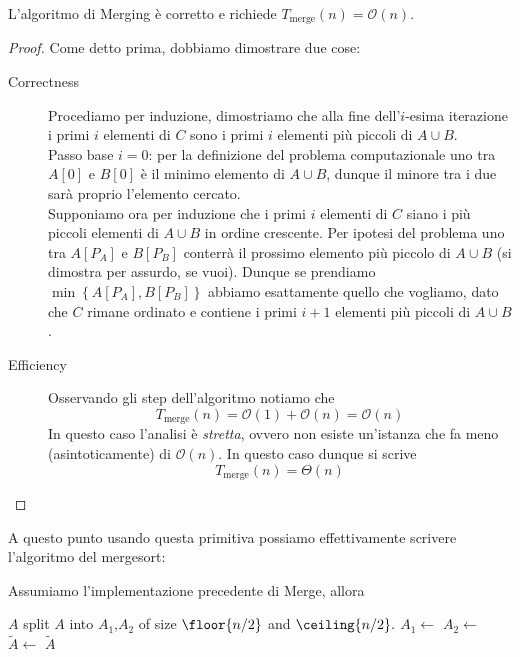 \documentclass[11pt]{scrartcl}
\newcommand{\bigo}{\mathcal{O}}
\begin{document}
	\begin{theorem}
		L'algoritmo di Merging è corretto e richiede $T_\text{merge}(n)=\bigo(n)$.
	\end{theorem}
	\begin{proof}
		Come detto prima, dobbiamo dimostrare due cose:
		\begin{description}
			\item[Correctness] Procediamo per induzione, dimostriamo che alla fine dell'$i$-esima iterazione i primi $i$ elementi di $C$ sono i primi $i$ elementi più piccoli di $A\cup B$. \\
			Passo base $i=0$: per la definizione del problema computazionale uno tra $A[0]$ e $B[0]$ è il minimo elemento di $A\cup B$, dunque il minore tra i due sarà proprio l'elemento cercato. \\
			Supponiamo ora per induzione che i primi $i$ elementi di $C$ siano i più piccoli elementi di $A\cup B$ in ordine crescente. Per ipotesi del problema uno tra $A[P_A]$ e $B[P_B]$ conterrà il prossimo elemento più piccolo di $A\cup B$ (si dimostra per assurdo, se vuoi). Dunque se prendiamo $\min\left\{A[P_A],B[P_B]\right\}$ abbiamo esattamente quello che vogliamo, dato che $C$ rimane ordinato e contiene i primi $i+1$ elementi più piccoli di $A\cup B$.
			\item[Efficiency] Osservando gli step dell'algoritmo notiamo che
			$$T_\text{merge}(n)=\bigo(1)+\bigo(n)=\bigo(n)$$
			In questo caso l'analisi è \textit{stretta}, ovvero non esiste un'istanza che fa meno (asintoticamente) di $\bigo(n)$. In questo caso dunque si scrive
			$$T_\text{merge}(n)=\Theta(n)$$
		\end{description}
	\end{proof}
	A questo punto usando questa primitiva possiamo effettivamente scrivere l'algoritmo del mergesort:
	\begin{algorithm}[Mergesort]
		Assumiamo l'implementazione precedente di Merge, allora
		\begin{algorithmic}[1]
				\State \Return $A$
				\EndIf
				\State split $A$ into $A_1$,$A_2$ of size $\floor{n/2}$ and $\ceiling{n/2}.$
				\State $A_1 \gets$ 
				\State $A_2 \gets$ 
				\State $\tilde{A} \gets$ 
			\State \Return $\tilde{A}$ 
			\EndFunction
		\end{algorithmic}
	\end{algorithm}
\end{document}
